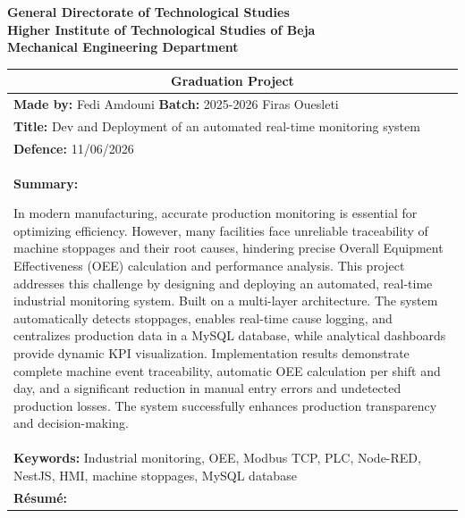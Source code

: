 \thispagestyle{plain}

\begin{center}
  {\large\bfseries General Directorate of Technological Studies}\\
  {\large\bfseries Higher Institute of Technological Studies of Beja}\\
  {\large\bfseries Mechanical Engineering Department }
\end{center}



\begin{center}
\renewcommand{\arraystretch}{1.3}
\begin{tabular}{|p{14.5cm}|}
\hline
\multicolumn{1}{|c|}{\textbf{Graduation Project}} \\
\hline
\textbf{Made by:} Fedi Amdouni \hfill \textbf{Batch:} 2025-2026 \newline
 \hspace*{1.86cm} Firas Ouesleti \\
\hline
\textbf{Title:} Dev and Deployment of an automated real-time monitoring system \\
\hline
\textbf{Defence:} 11/06/2026 \\
\hline
\textbf{Summary:}
\vspace{0.1cm}

In modern manufacturing, accurate production monitoring is
essential for optimizing efficiency. However, many facilities 
face unreliable traceability of machine stoppages and their root causes, 
hindering precise Overall Equipment Effectiveness (OEE) calculation and performance analysis. 
This project addresses this challenge by designing and deploying an automated, real-time industrial
monitoring system. Built on a multi-layer architecture. The system automatically detects stoppages, enables real-time cause logging, and centralizes production data in a MySQL database, while analytical dashboards provide dynamic KPI visualization. Implementation results demonstrate complete machine event traceability, automatic OEE calculation per shift and day, and a significant reduction in manual entry errors and undetected production losses. The system successfully enhances production transparency and decision-making.
\vspace{0.2cm}
\\
\hline
\textbf{Keywords:} Industrial monitoring, OEE, Modbus TCP, PLC, Node-RED, NestJS, HMI, machine stoppages, MySQL database \\
\hline\hline  \hline  
\textbf{Résumé:}
\vspace{0.1cm}


\end{tabular}
\end{center}
